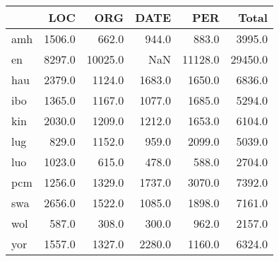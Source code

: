 \begin{tabular}{lrrrrr}
\toprule
{} &     LOC &      ORG &    DATE &      PER &    Total \\
\midrule
amh &  1506.0 &    662.0 &   944.0 &    883.0 &   3995.0 \\
en  &  8297.0 &  10025.0 &     NaN &  11128.0 &  29450.0 \\
hau &  2379.0 &   1124.0 &  1683.0 &   1650.0 &   6836.0 \\
ibo &  1365.0 &   1167.0 &  1077.0 &   1685.0 &   5294.0 \\
kin &  2030.0 &   1209.0 &  1212.0 &   1653.0 &   6104.0 \\
lug &   829.0 &   1152.0 &   959.0 &   2099.0 &   5039.0 \\
luo &  1023.0 &    615.0 &   478.0 &    588.0 &   2704.0 \\
pcm &  1256.0 &   1329.0 &  1737.0 &   3070.0 &   7392.0 \\
swa &  2656.0 &   1522.0 &  1085.0 &   1898.0 &   7161.0 \\
wol &   587.0 &    308.0 &   300.0 &    962.0 &   2157.0 \\
yor &  1557.0 &   1327.0 &  2280.0 &   1160.0 &   6324.0 \\
\bottomrule
\end{tabular}
